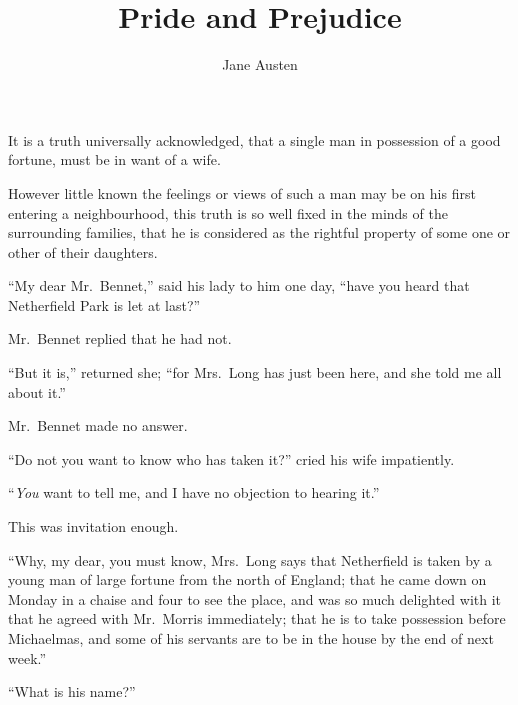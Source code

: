 \newenvironment{letter}{

\strut

}{

\strut

}

\newcommand{\LetterDate}[1]{
\vbox{\strut\itshape\small\raggedleft #1}
}

\newcommand{\LetterSig}[1]{
\vbox{\strut\scshape\raggedleft #1}
}


\frontmatter
\title{Pride and Prejudice}
\author{Jane Austen}
\date{}

\maketitle
\tableofcontents

\mainmatter
{}


It is a truth universally acknowledged, that a single man
in possession of a good fortune, must be in want of a wife.

However little known the feelings or views of such a
man may be on his first entering a neighbourhood, this
truth is so well fixed in the minds of the surrounding
families, that he is considered as the rightful property of
some one or other of their daughters.

“My dear Mr.\ Bennet,” said his lady to him one day,
“have you heard that Netherfield Park is let at last?”

Mr.\ Bennet replied that he had not.

“But it is,” returned she; “for Mrs.\ Long has just
been here, and she told me all about it.”

Mr.\ Bennet made no answer.

“Do not you want to know who has taken it?” cried
his wife impatiently.

“\textit{You} want to tell me, and I have no objection to
hearing it.”

This was invitation enough.

“Why, my dear, you must know, Mrs.\ Long says that
Netherfield is taken by a young man of large fortune from
the north of England; that he came down on Monday
in a chaise and four to see the place, and was so much
delighted with it that he agreed with Mr.\ Morris immediately;
that he is to take possession before Michaelmas,
and some of his servants are to be in the house by the end
of next week.”

“What is his name?”

